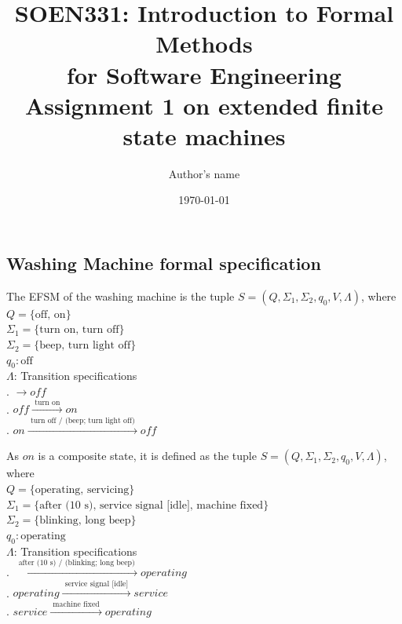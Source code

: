 \documentclass[12pt]{article}
\title{SOEN331: Introduction to Formal Methods\\for Software Engineering\\
Assignment 1 on extended finite state machines}
\author{Author's name}
\date{\today}
\begin{document}
\begin{spacing}{1.5}

\maketitle

\section{Washing Machine formal specification}

\noindent The EFSM of the washing machine is the tuple $S = (Q, \Sigma_1, \Sigma_2, q_0, V, \Lambda)$, where\\
\noindent $Q = \{\text {off, on}\}$\\
\noindent $\Sigma_1 = \{\text {turn on, turn off}\}$\\
\noindent $\Sigma_2 = \{\text {beep, turn light off}\}$\\
\noindent $q_0: \text{off}$\\
\noindent $\Lambda$: Transition specifications\\
. $\rightarrow off$\\
. $off \xrightarrow {\text { turn on }} on$\\
. $on \xrightarrow {\text { turn off / (beep; turn light off) }} off$\\
\newpage

\noindent As $on$ is a composite state, it is defined as the tuple $S = (Q, \Sigma_1, \Sigma_2, q_0, V, \Lambda)$, where\\
\noindent $Q = \{\text {operating, servicing}\}$\\
\noindent $\Sigma_1 = \{\text {after (10 s), service signal [idle], machine fixed}\}$\\
\noindent $\Sigma_2 = \{\text {blinking, long beep}\}$\\
\noindent $q_0: \text{operating}$\\
\noindent $\Lambda$: Transition specifications\\
. $\xrightarrow {\text { after (10 s) / (blinking; long beep) }} operating$\\
. $operating \xrightarrow {\text { service signal [idle] }} service$\\
. $service \xrightarrow {\text { machine fixed }} operating$\\


\end{spacing}
\end{document}
